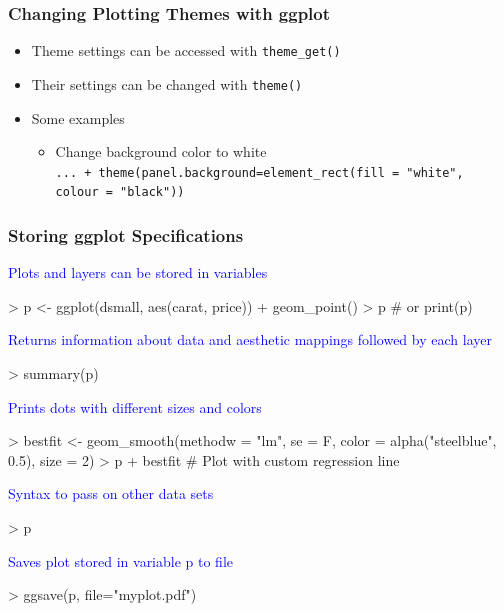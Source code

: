 \documentclass{beamer}
\newcommand{\Rfunction}[1]{{\texttt{#1}}}
\begin{document}
\begin{frame}[containsverbatim]  
	\frametitle{Changing Plotting Themes with ggplot}
\scriptsize
\begin{itemize}
	\item Theme settings can be accessed with \Rfunction{theme\_get()}
	\item Their settings can be changed with \Rfunction{theme()} 
	\item Some examples
        \begin{itemize}
	\scriptsize
        	\item Change background color to white \\
		\tiny
		\Rfunction{... + theme(panel.background=element\_rect(fill = "white", colour = "black"))} 
	\end{itemize}
\end{itemize}
\end{frame}
\begin{frame}[containsverbatim]  
	\frametitle{Storing ggplot Specifications}
\vspace{0cm}
\scriptsize 
\textcolor{blue}{Plots and layers can be stored in variables}
\begin{Schunk}
\begin{Sinput}
> p <- ggplot(dsmall, aes(carat, price)) + geom_point() 
> p # or print(p)
\end{Sinput}
\end{Schunk}
\textcolor{blue}{Returns information about data and aesthetic mappings followed by each layer}
\begin{Schunk}
\begin{Sinput}
> summary(p) 
\end{Sinput}
\end{Schunk}
\textcolor{blue}{Prints dots with different sizes and colors}
\begin{Schunk}
\begin{Sinput}
> bestfit <- geom_smooth(methodw = "lm", se = F, color = alpha("steelblue", 0.5), size = 2)
> p + bestfit # Plot with custom regression line
\end{Sinput}
\end{Schunk}
\textcolor{blue}{Syntax to pass on other data sets}
\begin{Schunk}
\begin{Sinput}
> p %
\end{Sinput}
\end{Schunk}
\textcolor{blue}{Saves plot stored in variable p to file}
\begin{Schunk}
\begin{Sinput}
> ggsave(p, file="myplot.pdf") 
\end{Sinput}
\end{Schunk}
\end{frame}
\end{document}
